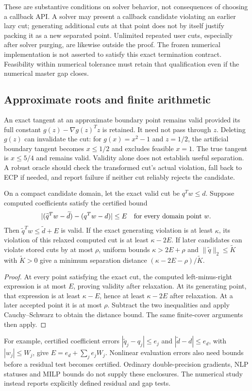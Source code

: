 These are substantive conditions on solver behavior, not consequences of choosing a callback API. A solver may present a callback candidate violating an earlier lazy cut; generating additional cuts at that point does not by itself justify packing it as a new separated point. Unlimited repeated user cuts, especially after solver purging, are likewise outside the proof. The frozen numerical implementation is not asserted to satisfy this exact termination contract. Feasibility within numerical tolerance must retain that qualification even if the numerical master gap closes.

\subsection{Approximate roots and finite arithmetic}\label{sec:arithmetic}
An exact tangent at an approximate boundary point remains valid provided its full constant $g(z)-\nabla g(z)^Tz$ is retained. It need not pass through $z$. Deleting $g(z)$ can invalidate the cut: for $g(x)=x^2-1$ and $z=1/2$, the artificial boundary tangent becomes $x\le1/2$ and excludes feasible $x=1$. The true tangent is $x\le5/4$ and remains valid. Validity alone does not establish useful separation. A robust oracle should check the transformed cut's actual violation, fall back to ECP if needed, and report failure if neither cut reliably rejects the candidate.

\begin{proposition}\label{prop:arithmetic}
On a compact candidate domain, let the exact valid cut be $q^Tw\le d$. Suppose computed coefficients satisfy the certified bound
\[
 |(\widetilde q^Tw-\widetilde d)-(q^Tw-d)|\le E
 \quad\hbox{for every domain point }w.
\]
Then $\widetilde q^Tw\le\widetilde d+E$ is valid. If the exact generating violation is at least $\kappa$, its violation of this relaxed computed cut is at least $\kappa-2E$. If later candidates can violate stored cuts by at most $\rho$, uniform bounds $\kappa>2E+\rho$ and $\|\widetilde q\|_2\le\widetilde K$ with $\widetilde K>0$ give a minimum separation distance $(\kappa-2E-\rho)/\widetilde K$.
\end{proposition}
\begin{proof}
At every point satisfying the exact cut, the computed left-minus-right expression is at most $E$, proving validity after relaxation. At its generating point, that expression is at least $\kappa-E$, hence at least $\kappa-2E$ after relaxation. At a later accepted point it is at most $\rho$. Subtract the two inequalities and apply Cauchy--Schwarz to obtain the distance bound. The same finite-cover arguments then apply.
\end{proof}
For example, certified coefficient errors $|\widetilde q_j-q_j|\le e_j$ and $|\widetilde d-d|\le e_d$, with $|w_j|\le W_j$, give $E=e_d+\sum_j e_jW_j$. Nonlinear evaluation errors also need bounds before a residual test becomes certified. Ordinary double-precision gradients, NLP statuses and MILP bounds do not supply these enclosures. The numerical study instead reports explicitly defined residual and gap tests.
